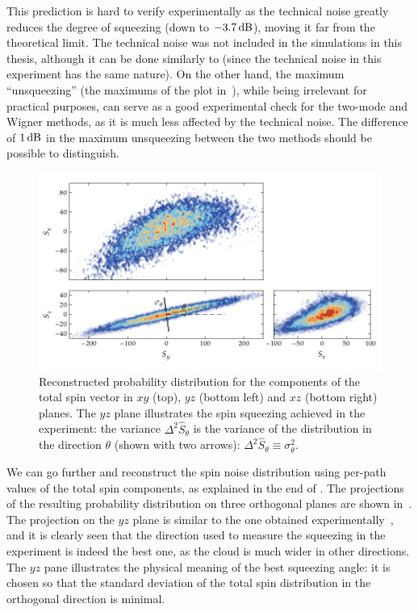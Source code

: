 This prediction is hard to verify experimentally as the technical noise greatly reduces the degree of squeezing (down to $-3.7\mbox{\ensuremath{\,\mathrm{dB}}}$), moving it far from the theoretical limit.
The technical noise was not included in the simulations in this thesis, although it can be done similarly to  (since the technical noise in this experiment has the same nature).
On the other hand, the maximum ``unsqueezing'' (the maximums of the plot in~), while being irrelevant for practical purposes, can serve as a good experimental check for the two-mode and Wigner methods, as it is much less affected by the technical noise.
The difference of $1\mbox{\ensuremath{\,\mathrm{dB}}}$ in the maximum unsqueezing between the two methods should be possible to distinguish.

\begin{figure}
    \centerline{\includegraphics{figures_generated/bec_squeezing/riedel_cloud.pdf}}

    \caption[Orthogonal projections of total spin uncertainty cloud]{
    Reconstructed probability distribution for the components of the total spin vector in $xy$ (top), $yz$ (bottom left) and $xz$ (bottom right) planes.
    The $yz$ plane illustrates the spin squeezing achieved in the experiment: the variance $\Delta^2 \hat{S}_\theta$ is the variance of the distribution in the direction $\theta$ (shown with two arrows): $\Delta^2 \hat{S}_\theta \equiv \sigma_\theta^2$.}%
    \label{fig:bec-squeezing:separation:cloud}
\end{figure}

We can go further and reconstruct the spin noise distribution using per-path values of the total spin components, as explained in the end of .
The projections of the resulting probability distribution on three orthogonal planes are shown in~.
The projection on the $yz$ plane is similar to the one obtained experimentally~\cite{Riedel2010}, and it is clearly seen that the direction used to measure the squeezing in the experiment is indeed the best one, as the cloud is much wider in other directions.
The $yz$ pane illustrates the physical meaning of the best squeezing angle: it is chosen so that the standard deviation of the total spin distribution in the orthogonal direction is minimal.
